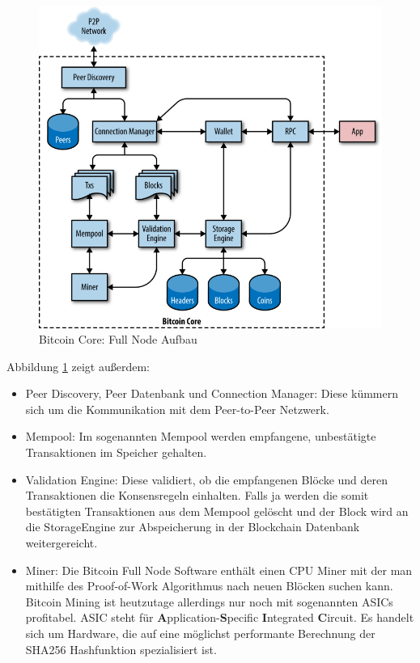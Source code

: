 \begin{figure}[H]
\centering
\includegraphics[width=1\linewidth]{Figures/btc_core_full_node_architecture}
\decoRule
\caption{Bitcoin Core: Full Node Aufbau \cite{mastering_bitcoin}}
\label{fig:btc_core_full_node_architecture}
\end{figure}
Abbildung \ref{fig:btc_core_full_node_architecture} zeigt außerdem: 
\begin{itemize}
\item Peer Discovery, Peer Datenbank und Connection Manager: Diese kümmern sich um die Kommunikation mit dem Peer-to-Peer Netzwerk.
\item Mempool: Im sogenannten Mempool werden empfangene, unbestätigte Transaktionen im Speicher gehalten.
\item Validation Engine: Diese validiert, ob die empfangenen Blöcke und deren Transaktionen die Konsensregeln einhalten. Falls ja werden die somit bestätigten Transaktionen aus dem Mempool gelöscht und der Block wird an die StorageEngine zur Abspeicherung in der Blockchain Datenbank weitergereicht.
\item Miner: Die Bitcoin Full Node Software enthält einen CPU Miner mit der man mithilfe des Proof-of-Work Algorithmus nach neuen Blöcken suchen kann. Bitcoin Mining ist heutzutage allerdings nur noch mit sogenannten ASICs profitabel. ASIC steht für \textbf{A}pplication-\textbf{S}pecific \textbf{I}ntegrated \textbf{C}ircuit. Es handelt sich um Hardware, die auf eine möglichst performante Berechnung der SHA256 Hashfunktion spezialisiert ist.
\end{itemize}


